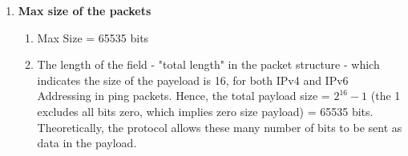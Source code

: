 \documentclass[12pt]{article}
\begin{document}
\begin{enumerate}
    \item \textbf{Max size of the packets}
    \begin{enumerate}
        \item Max Size = 65535 bits
        \item The length of the field - "total length" in the packet structure - which indicates the size of the payeload is 16, for both IPv4 and IPv6 Addressing in ping packets. Hence, the total payload size = $2^{16} - 1$ (the 1 excludes all bits zero, which implies zero size payload) = 65535 bits. Theoretically, the protocol allows these many number of bits to be sent as data in the payload.
    \end{enumerate}
\end{enumerate}
\end{document}
